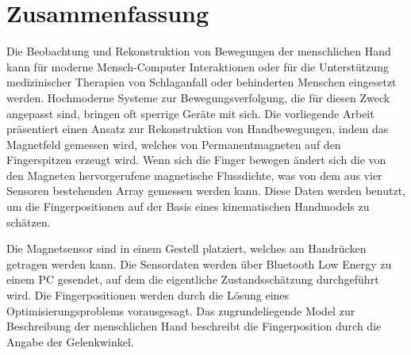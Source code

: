 

\chapter*{Zusammenfassung}

Die Beobachtung und Rekonstruktion von Bewegungen der menschlichen Hand kann für moderne Mensch-Computer Interaktionen oder für die Unterstützung medizinischer Therapien von Schlaganfall oder behinderten Menschen eingesetzt werden. Hochmoderne Systeme zur Bewegungsverfolgung, die für diesen Zweck angepasst sind, bringen oft sperrige Geräte mit sich. Die vorliegende Arbeit präsentiert einen Ansatz zur Rekonstruktion von Handbewegungen, indem das Magnetfeld gemessen wird, welches von Permanentmagneten auf den Fingerspitzen erzeugt wird. Wenn sich die Finger bewegen ändert sich die von den Magneten hervorgerufene magnetische Flussdichte, was von dem aus vier Sensoren bestehenden Array gemessen werden kann. Diese Daten werden benutzt, um die Fingerpositionen auf der Basis eines kinematischen Handmodels zu schätzen.

Die Magnetsensor sind in einem Gestell platziert, welches am Handrücken getragen werden kann. Die Sensordaten werden über Bluetooth Low Energy zu einem PC gesendet, auf dem die eigentliche Zustandsschätzung durchgeführt wird. Die Fingerpositionen werden durch die Lösung eines Optimisierungsproblems vorausgesagt. Das zugrundeliegende Model zur Beschreibung der menschlichen Hand beschreibt die Fingerposition durch die Angabe der Gelenkwinkel. 


